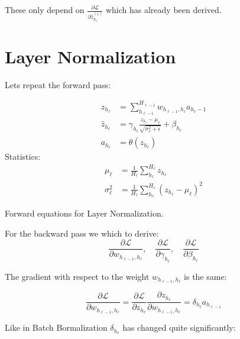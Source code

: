 These only depend on $\frac{\partial \mathcal{L}}{\partial \hat{z}_{h_\ell}^{(i)}}$ which has already been derived.

\section{Layer Normalization}

Lets repeat the forward pass:
\begin{equationbox}
\begin{equation*}
\begin{aligned}
z_{h_\ell} &= \sum_{h_{\ell-1}}^{H_{\ell-1}} w_{h_{\ell-1},h_\ell} a_{h_\ell-1} \\
\hat{z}_{h_\ell} &= \gamma_{h_\ell} \frac{z_{h_\ell} - \mu_{\ell}}{\sqrt{\sigma_{\ell}^2 + \epsilon}} + \beta_{h_\ell} \\
a_{h_\ell} &= \theta\left(z_{h_\ell}\right)
\end{aligned}
\end{equation*}
Statistics:
\begin{equation*}
\begin{aligned}
\mu_{\ell} &= \frac{1}{H_\ell} \sum_{h_\ell}^{H_\ell} z_{h_\ell} \\
\sigma_{\ell}^2 &= \frac{1}{H_\ell} \sum_{h_\ell}^{H_\ell} (z_{h_\ell} - \mu_{\ell})^2
\end{aligned}
\end{equation*}
\caption{Forward equations for Layer Normalization.}
\end{equationbox}

For the backward pass we which to derive:
\begin{equation}
\frac{\partial \mathcal{L}}{\partial w_{h_{\ell-1},h_\ell}},\quad \frac{\partial \mathcal{L}}{\partial \gamma_{h_\ell}},\quad \frac{\partial \mathcal{L}}{\partial \beta_{h_\ell}}
\end{equation}

The gradient with respect to the weight $w_{h_{\ell-1},h_\ell}$ is the same:

\begin{equation}
\frac{\partial \mathcal{L}}{\partial w_{h_{\ell-1},h_\ell}} = \frac{\partial \mathcal{L}}{\partial z_{h_\ell}} \frac{\partial z_{h_\ell}}{\partial w_{h_{\ell-1},h_\ell}} = \delta_{h_\ell} a_{h_{\ell-1}}
\end{equation}

Like in Batch Bormalization $\delta_{h_\ell}$ has changed quite significantly:

